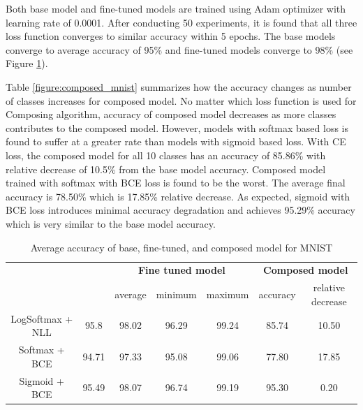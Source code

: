\documentclass{article}
\begin{document}
Both base model and fine-tuned models are trained using Adam optimizer with learning rate of 0.0001. After conducting 50 experiments, it is found that all three loss function converges to similar accuracy within 5 epochs. The base models converge to average accuracy of 95\% and fine-tuned models converge to 98\% (see Figure \ref{table:mnist}).

Table \ref{figure:composed_mnist} summarizes how the accuracy changes as number of classes increases for composed model. No matter which loss function is used for Composing algorithm, accuracy of composed model decreases as more classes contributes to the composed model. However, models with softmax based loss is found to suffer at a greater rate than models with sigmoid based loss. With CE loss, the composed model for all 10 classes has an accuracy of 85.86\% with relative decrease of 10.5\% from the base model accuracy. Composed model trained with softmax with BCE loss is found to be the worst. The average final accuracy is 78.50\% which is 17.85\% relative decrease. As expected, sigmoid with BCE loss introduces minimal accuracy degradation and achieves 95.29\% accuracy which is very similar to the base model accuracy.

\begin{table}[t]
    \centering
    \begin{tabular}{ccccccc}
        \toprule[1pt]
        \multirow{2}{*}{\raisebox{-3\heavyrulewidth}{\bf Loss function}} &
        \multirow{2}{*}{\raisebox{-3\heavyrulewidth}{\bf Base model}} &
        \multicolumn{3}{c}{\bf Fine tuned model } &
        \multicolumn{2}{c}{\bf Composed model } \\
        \cmidrule(lr){3-5}
        \cmidrule(lr){6-7}
        & & average & minimum & maximum & accuracy & relative decrease \\
        \midrule
        LogSoftmax + NLL & 95.8 & 98.02 & 96.29 & 99.24 & 85.74 & 10.50 \\
        Softmax + BCE & 94.71 & 97.33 & 95.08 & 99.06 & 77.80 & 17.85 \\
        Sigmoid + BCE & 95.49 & 98.07 & 96.74 & 99.19 & 95.30 & 0.20 \\
        \bottomrule[1pt]
    \end{tabular}
    \caption{Average accuracy of base, fine-tuned, and composed model for MNIST}
    \label{table:mnist}
\end{table}
\end{document}
